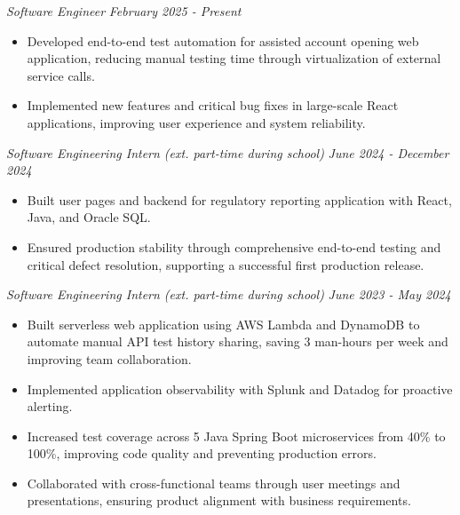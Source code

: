 \documentclass[letterpaper]{article}
\begin{document}
    \textit{Software Engineer} \hfill \textsl{February 2025 - Present}\\
    \vspace{-7pt}
    \begin{itemize} \itemsep -1mm

            \item Developed end-to-end test automation for assisted account opening web application, reducing manual testing time through virtualization of external service calls.

            \item Implemented new features and critical bug fixes in large-scale React applications, improving user experience and system reliability.

    \end{itemize}
    \vspace{-2mm}
    
    \textit{Software Engineering Intern (ext. part-time during school)} \hfill \textsl{June 2024 - December 2024}\\
    \vspace{-7pt}
    \begin{itemize} \itemsep -1mm

            \item Built user pages and backend for regulatory reporting application with React, Java, and Oracle SQL.
            
            \item Ensured production stability through comprehensive end-to-end testing and critical defect resolution, supporting a successful first production release.

    \end{itemize}
    \vspace{-2mm}


    \textit{Software Engineering Intern (ext. part-time during school)} \hfill \textsl{June 2023 - May 2024}\\
    \vspace{-7pt}
    \begin{itemize} \itemsep -1mm
        
            \item Built serverless web application using AWS Lambda and DynamoDB to automate manual API test history sharing, saving 3 man-hours per week and improving team collaboration.            
            
            \item Implemented application observability with Splunk and Datadog for proactive alerting.

            \item Increased test coverage across 5 Java Spring Boot microservices from 40\% to 100\%, improving code quality and preventing production errors.

            \item Collaborated with cross-functional teams through user meetings and presentations, ensuring product alignment with business requirements.
                
    \end{itemize}
    \vspace{-2mm}
\end{document}
